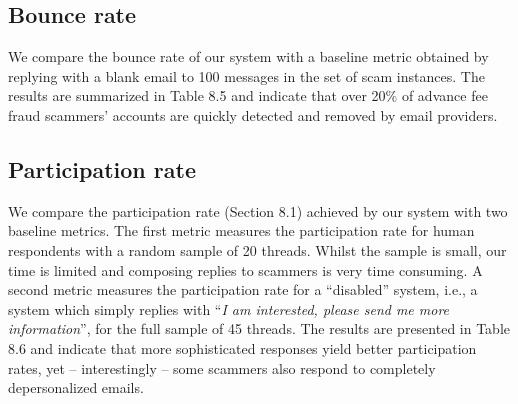\begin{table}[h]
  \centering
{}
\caption{Experiment overview}
\end{table}

\subsection{Bounce rate}
We compare the bounce rate of our system with a baseline metric obtained by replying with a blank email to 100 messages in the set of scam instances. The results are summarized in Table 8.5 and indicate that over 20\% of advance fee fraud scammers' accounts are quickly detected and removed by email providers.

\begin{table}[h]
  \centering
{}
\caption{Comparison of bounce rates}
\end{table}

\subsection{Participation rate}
We compare the participation rate (Section 8.1) achieved by our system with two baseline metrics. The first metric measures the participation rate for human respondents with a random sample of 20 threads. Whilst the sample is small, our time is limited and composing replies to scammers is very time consuming. A second metric measures the participation rate for a ``disabled'' system, i.e., a system which simply replies with ``\textit{I am interested, please send me more information}'', for the full sample of 45 threads.  The results are presented in Table 8.6 and indicate that more sophisticated responses yield better participation rates, yet -- interestingly -- some scammers also respond to completely depersonalized emails.

